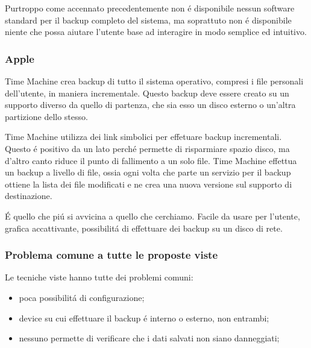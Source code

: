 \documentclass{beamer}
\begin{document}
\begin{frame}
Purtroppo come accennato precedentemente non \'e disponibile nessun software standard per il backup completo del sistema, ma soprattuto non \'e disponibile niente che possa aiutare l'utente base ad interagire in modo semplice ed intuitivo.
\end{frame}

\begin{frame}
\frametitle{Apple}
Time Machine crea backup di tutto il sistema operativo, compresi i file personali dell'utente, in maniera incrementale.
\newline
Questo backup deve essere creato su un supporto diverso da quello di partenza, che sia esso un disco esterno o un'altra partizione dello stesso.
\end{frame}

\begin{frame}
Time Machine utilizza dei link simbolici per effetuare backup incrementali. 
\newline
Questo \'e positivo da un lato perch\'e permette di risparmiare spazio disco, ma d'altro canto riduce il punto di fallimento a un solo file.
\newline
Time Machine effettua un backup a livello di file, ossia ogni volta che parte un servizio per il backup ottiene la lista dei file modificati e ne crea una nuova versione sul supporto di destinazione.
\end{frame}

\begin{frame}
\'E quello che pi\'u si avvicina a quello che cerchiamo.
\newline
Facile da usare per l'utente, grafica accattivante, possibilit\'a di effettuare dei backup su un disco di rete.
\end{frame}

\begin{frame}
\frametitle{Problema comune a tutte le proposte viste}
Le tecniche viste hanno tutte dei problemi comuni:
\begin{itemize}
\item poca possibilit\'a di configurazione;
\item device su cui effettuare il backup \'e interno o esterno, non entrambi;
\item nessuno permette di verificare che i dati salvati non siano danneggiati;
\end{itemize}
\end{frame}
\end{document}
